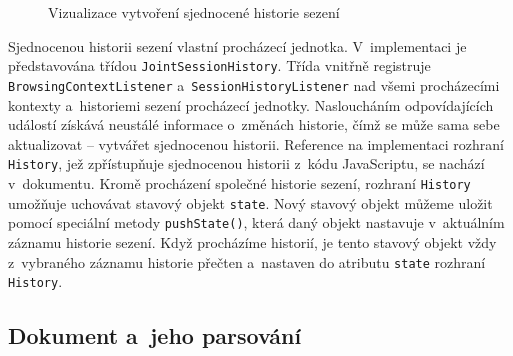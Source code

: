 \bigskip

\begin{figure}[H]
  \begin{center}
    \caption{Vizualizace vytvoření sjednocené historie sezení}
    \label{Figure.JointSessionHistory}
  \end{center}
\end{figure}

Sjednocenou historii sezení vlastní procházecí jednotka. V~implementaci je představována třídou \texttt{JointSessionHistory}. Třída vnitřně registruje \texttt{BrowsingContextListener} a~\texttt{SessionHistoryListener} nad všemi procházecími kontexty a~historiemi sezení procházecí jednotky. Nasloucháním odpovídajících událostí získává neustálé informace o~změnách historie, čímž se může sama sebe aktualizovat -- vytvářet sjednocenou historii. Reference na implementaci rozhraní \texttt{History}, jež zpřístupňuje sjednocenou historii z~kódu JavaScriptu, se nachází v~dokumentu. Kromě procházení společné historie sezení, rozhraní \texttt{History} umožňuje uchovávat stavový objekt \texttt{state}. Nový stavový objekt můžeme uložit pomocí speciální metody \texttt{pushState()}, která daný objekt nastavuje v~aktuálním záznamu historie sezení. Když procházíme historií, je tento stavový objekt vždy z~vybraného záznamu historie přečten a~nastaven do atributu \texttt{state} rozhraní \texttt{History}.

\newpage

\subsection{Dokument a~jeho parsování}
\label{Chapter.Implementation.DocumentParsing}


